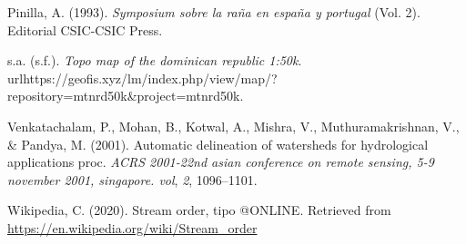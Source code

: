 \documentclass[11pt,]{article}
\begin{document}
\hypertarget{ref-pinilla1993symposium}{}
Pinilla, A. (1993). \emph{Symposium sobre la raña en españa y portugal}
(Vol. 2). Editorial CSIC-CSIC Press.

\hypertarget{ref-TopoMap}{}
s.a. (s.f.). \emph{Topo map of the dominican republic 1:50k}.
urlhttps://geofis.xyz/lm/index.php/view/map/?repository=mtnrd50k\&project=mtnrd50k.

\hypertarget{ref-venkatachalam2001automatic}{}
Venkatachalam, P., Mohan, B., Kotwal, A., Mishra, V., Muthuramakrishnan,
V., \& Pandya, M. (2001). Automatic delineation of watersheds for
hydrological applications proc. \emph{ACRS 2001-22nd asian conference on
remote sensing, 5-9 november 2001, singapore. vol}, \emph{2},
1096--1101.

\hypertarget{ref-wikipedia2020stream}{}
Wikipedia, C. (2020). Stream order, tipo @ONLINE. Retrieved from
\url{https://en.wikipedia.org/wiki/Stream_order}




\newpage
\singlespacing 
\end{document}
